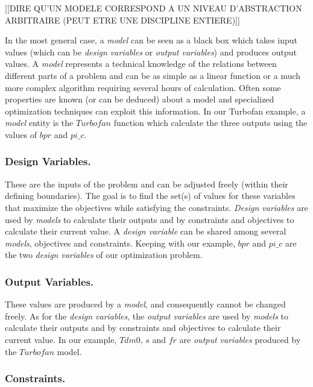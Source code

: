 [[DIRE QU'UN MODELE CORRESPOND A UN NIVEAU D'ABSTRACTION ARBITRAIRE (PEUT ETRE UNE DISCIPLINE ENTIERE)]]

In the most general case, a \emph{model} can be seen as a black box which takes input values (which can be \emph{design variables} or \emph{output variables}) and produces output values. A \emph{model} represents a technical knowledge of the relations between different parts of a problem and can be as simple as a linear function or a much more complex algorithm requiring several hours of calculation. Often some properties are known (or can be deduced) about a model and specialized optimization techniques can exploit this information.
In our Turbofan example, a \emph{model} entity is the $Turbofan$ function which calculate the three outputs using the values of $bpr$ and $pi\_c$.

\subsubsection*{Design Variables.}

These are the inputs of the problem and can be adjusted freely (within their defining boundaries). The goal is to find the set(s) of values for these variables that maximize the objectives while satisfying the constraints.
\emph{Design variables} are used by \emph{models} to calculate their outputs and by constraints and objectives to calculate their current value. A \emph{design variable} can be shared among several \emph{models}, objectives and constraints.
Keeping with our example, $bpr$ and $pi\_c$ are the two \emph{design variables} of our optimization problem.

\subsubsection*{Output Variables.}

These values are produced by a \emph{model}, and consequently cannot be changed freely.
As for the \emph{design variables}, the \emph{output variables} are used by \emph{models} to calculate their outputs and by constraints and objectives to calculate their current value.
In our example, $Tdm0$, $s$ and $fr$ are \emph{output variables} produced by the $Turbofan$ model.

\subsubsection*{Constraints.}

